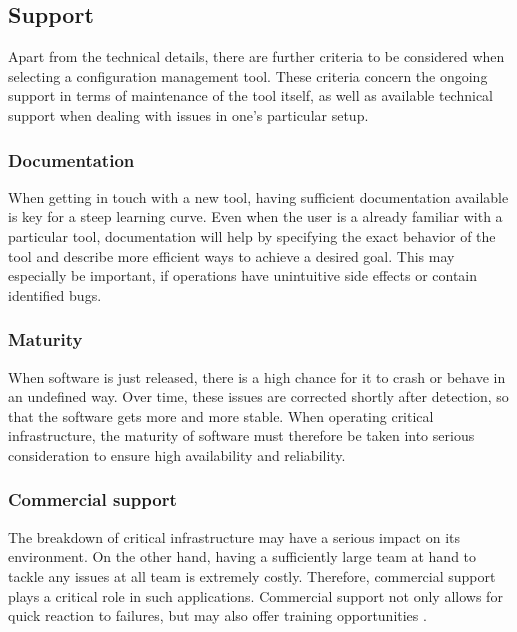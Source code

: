 \subsection{Support}

Apart from the technical details, there are further criteria to be considered when selecting a configuration management tool. These criteria concern the ongoing support in terms of maintenance of the tool itself, as well as available technical support when dealing with issues in one's particular setup.

\subsubsection{Documentation}

When getting in touch with a new tool, having sufficient documentation available is key for a steep learning curve. Even when the user is a already familiar with a particular tool, documentation will help by specifying the exact behavior of the tool and describe more efficient ways to achieve a desired goal. This may especially be important, if operations have unintuitive side effects or contain identified bugs.


\subsubsection{Maturity}

When software is just released, there is a high chance for it to crash or behave in an undefined way. Over time, these issues are corrected shortly after detection, so that the software gets more and more stable. When operating critical infrastructure, the maturity of software must therefore be taken into serious consideration to ensure high availability and reliability.


\subsubsection{Commercial support}

The breakdown of critical infrastructure may have a serious impact on its environment. On the other hand, having a sufficiently large team at hand to tackle any issues at all team is extremely costly. Therefore, commercial support plays a critical role in such applications. Commercial support not only allows for quick reaction to failures, but may also offer training opportunities \cite{delaet2010survey}.

